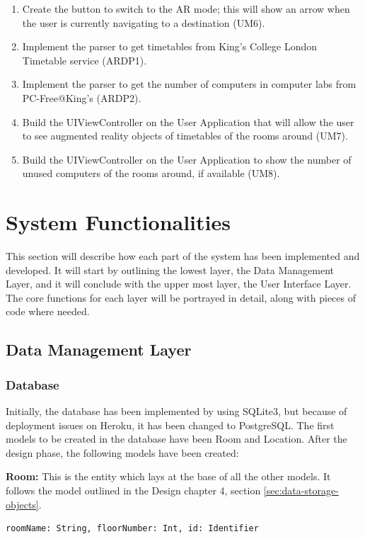 \begin{enumerate}
    \item Create the button to switch to the AR mode; this will show an arrow when the user is currently navigating to a destination (UM6).
    \item Implement the parser to get timetables from King's College London Timetable service (ARDP1).
    \item Implement the parser to get the number of computers in computer labs from PC-Free@King's (ARDP2).
    \item Build the UIViewController on the User Application that will allow the user to see augmented reality objects of timetables of the rooms around (UM7).
    \item Build the UIViewController on the User Application to show the number of unused computers of the rooms around, if available (UM8).
\end{enumerate}

\section{System Functionalities}

This section will describe how each part of the system has been implemented and developed. It will start by outlining the lowest layer, the Data Management Layer, and it will conclude with the upper most layer, the User Interface Layer. The core functions for each layer will be portrayed in detail, along with pieces of code where needed.

\subsection{Data Management Layer}
\subsubsection{Database}
Initially, the database has been implemented by using SQLite3, but because of deployment issues on Heroku, it has been changed to PostgreSQL. The first models to be created in the database have been Room and Location. After the design phase, the following models have been created:

\noindent
\textbf{Room: }This is the entity which lays at the base of all the other models. It follows the model outlined in the Design chapter 4, section \ref{sec:data-storage-objects}.
\begin{lstlisting}
roomName: String, floorNumber: Int, id: Identifier
\end{lstlisting}

